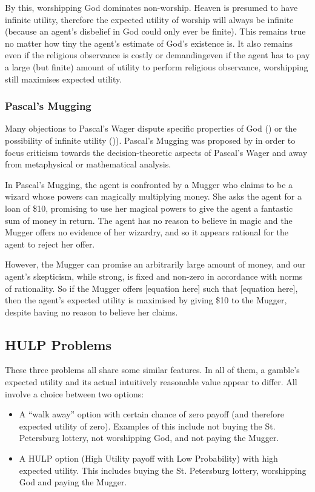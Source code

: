 \documentclass{article}
\begin{document}
By this, worshipping God dominates non-worship. Heaven is presumed to have infinite utility, therefore the expected utility of worship will always be infinite (because an agent's disbelief in God could only ever be finite). This remains true no matter how tiny the agent's estimate of God's existence is. It also remains even if the religious observance is costly or demanding\textemdash even if the agent has to pay a large (but finite) amount of utility to perform religious observance, worshipping still maximises expected utility.

\subsubsection {Pascal's Mugging}
Many objections to Pascal's Wager dispute specific properties of God (\citep{mackie1990miracle}) or the possibility of infinite utility (\citep{mcclennen1994pascal})). Pascal's Mugging was proposed by \citep{bostrom2009pascal} in order to focus criticism towards the decision-theoretic aspects of Pascal's Wager and away from metaphysical or mathematical analysis.

In Pascal's Mugging, the agent is confronted by a Mugger who claims to be a wizard whose powers can magically multiplying money. She asks the agent for a loan of \$10, promising to use her magical powers to give the agent a fantastic sum of money in return. The agent has no reason to believe in magic and the Mugger offers no evidence of her wizardry, and so it appears rational for the agent to reject her offer.

However, the Mugger can promise an arbitrarily large amount of money, and our agent's skepticism, while strong, is fixed and non-zero in accordance with norms of rationality. So if the Mugger offers [equation here] such that [equation here], then the agent's expected utility is maximised by giving \$10 to the Mugger, despite having no reason to believe her claims.

\subsection{HULP Problems}
These three problems all share some similar features. In all of them, a gamble's expected utility and its actual intuitively reasonable value appear to differ. All involve a choice between two options:

\begin{itemize}
\item A “walk away” option with certain chance of zero payoff (and therefore expected utility of zero). Examples of this include not buying the St. Petersburg lottery, not worshipping God, and not paying the Mugger.
\item A HULP option (High Utility payoff with Low Probability) with high expected utility. This includes buying the St. Petersburg lottery, worshipping God and paying the Mugger.
\end{itemize}
\end{document}
